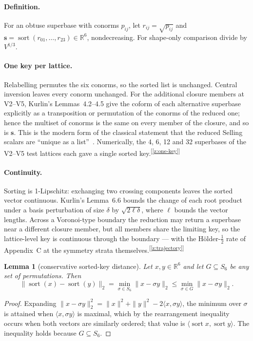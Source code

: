 \documentclass[11pt]{article}
\newcommand{\sortkey}{\mathbf{s}}
\newtheorem{lemma}{Lemma}[section]
\newcommand{\chk}[1]{\textsuperscript{[\ref{#1}]}}
\begin{document}
\paragraph{Definition.}
For an obtuse superbase with conorms $p_{ij}$, let $r_{ij}=\sqrt{p_{ij}}$ and $\sortkey=\operatorname{sort}(r_{01},\dots,r_{23})\in\mathbb R^6$, nondecreasing. For shape-only comparison divide by $V^{1/3}$.

\paragraph{One key per lattice.}
Relabelling permutes the six conorms, so the sorted list is unchanged. Central inversion leaves every conorm unchanged. For the additional closure members at V2--V5, Kurlin's Lemmas~4.2--4.5 give the coform of each alternative superbase explicitly as a transposition or permutation of the conorms of the reduced one; hence the multiset of conorms is the same on every member of the closure, and so is $\sortkey$. This is the modern form of the classical statement that the reduced Selling scalars are ``unique as a list''~\cite{bravais1850,delone1932,abs2019}. Numerically, the 4, 6, 12 and 32 superbases of the V2--V5 test lattices each gave a single sorted key.\chk{z:one-key}

\paragraph{Continuity.}
Sorting is 1-Lipschitz: exchanging two crossing components leaves the sorted vector continuous. Kurlin's Lemma~6.6 bounds the change of each root product under a basis perturbation of size $\delta$ by $\sqrt{2\ell\delta}$, where $\ell$ bounds the vector lengths. Across a Voronoi-type boundary the reduction may return a superbase near a different closure member, but all members share the limiting key, so the lattice-level key is continuous through the boundary --- with the H\"older-$\tfrac12$ rate of Appendix~C at the symmetry strata themselves.\chk{z:trajectory}

\begin{lemma}[conservative sorted-key distance]
\label{lem:lb}
Let $x,y\in\mathbb R^6$ and let $G\subseteq S_6$ be any set of permutations. Then
\[
\|\operatorname{sort}(x)-\operatorname{sort}(y)\|_2=\min_{\sigma\in S_6}\|x-\sigma y\|_2\le\min_{\sigma\in G}\|x-\sigma y\|_2 .
\]
\end{lemma}
\begin{proof}
Expanding $\|x-\sigma y\|_2^2=\|x\|^2+\|y\|^2-2\langle x,\sigma y\rangle$, the minimum over $\sigma$ is attained when $\langle x,\sigma y\rangle$ is maximal, which by the rearrangement inequality occurs when both vectors are similarly ordered; that value is $\langle\operatorname{sort}x,\operatorname{sort}y\rangle$. The inequality holds because $G\subseteq S_6$.
\end{proof}
\end{document}
